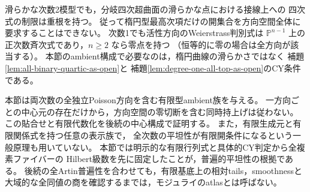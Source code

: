 \begin{remark}[楕円型方向だけでは不十分であること]
滑らかな次数2模型でも，分岐四次超曲面の滑らかな点における接線上への
四次式の制限は重根を持つ。
従って楕円型最高次項だけの開集合を方向空間全体に要求することはできない。
次数1でも活性方向のWeierstrass判別式は
$\mathbb P^{n-1}$ 上の正次数斉次式であり，$n\ge2$ なら零点を持つ
（恒等的に零の場合は全方向が該当する）。
本節のambient構成で必要なのは，楕円曲線の滑らかさではなく
補題\ref{lem:all-binary-quartic-as-open}と
補題\ref{lem:degree-one-all-top-as-open}のCY条件である。
\end{remark}

\begin{remark}[ambientから中心商への論理]
本節は両次数の全独立Poisson方向を含む有限型ambient族を与える。
一方向ごとの中心元の存在だけから，方向空間の零切断を含む同時持上げは従わない。
この貼合せと有限代数化を後続の中心構成で証明する。
また，有限生成元と有限関係式を持つ任意の表示族で，
全次数の平坦性が有限開条件になるという一般原理も用いていない。
本節では明示的な有限行列式と具体的CY判定から全複素ファイバーの
Hilbert級数を先に固定したことが，普遍的平坦性の根拠である。
後続の全Artin普遍性を合わせても，有限基底上の相対tails，smoothnessと
大域的な全同値の商を確認するまでは，モジュライのatlasとは呼ばない。
\end{remark}
